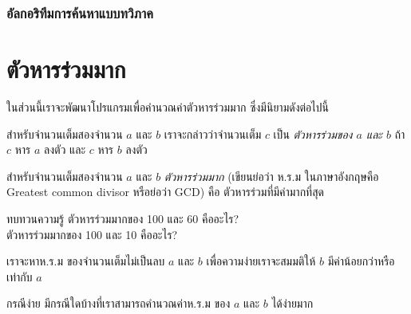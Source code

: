 \subsubsection{อัล{\wbr}กอ{\wbr}ริ{\wbr}ทึม{\wbr}การ{\wbr}ค้นหา{\wbr}แบบ{\wbr}ทวิภาค}

\section{ตัวหารร่วมมาก}

ใน{\wbr}ส่วน{\wbr}นี้{\wbr}เรา{\wbr}จะ{\wbr}พัฒนา{\wbr}โปรแกรม{\wbr}เพื่อ{\wbr}คำนวณ{\wbr}ค่าตัว{\wbr}หารร่วมมาก ซึ่ง{\wbr}มี{\wbr}นิยาม{\wbr}ดังต่อไปนี้{\wbr}

สำหรับ{\wbr}จำนวนเต็ม{\wbr}สอง{\wbr}จำนวน $a$ และ $b$ เรา{\wbr}จะ{\wbr}กล่าว{\wbr}ว่า{\wbr}จำนวนเต็ม $c$ เป็น {\em
ตัวหาร{\wbr}ร่วม{\wbr}ของ $a$ และ $b$} ถ้า $c$ หาร $a$ ลงตัว และ $c$ หาร $b$ ลงตัว{\wbr}

สำหรับ{\wbr}จำนวนเต็ม{\wbr}สอง{\wbr}จำนวน $a$ และ $b$ {\em ตัวหารร่วมมาก} (เขียน{\wbr}ย่อ{\wbr}ว่า ห.{\wbr}ร.{\wbr}ม
ใน{\wbr}ภาษาอังกฤษ{\wbr}คือ Greatest common divisor หรือ{\wbr}ย่อ{\wbr}ว่า GCD)  คือ{\wbr}
ตัวหาร{\wbr}ร่วม{\wbr}ที่{\wbr}มี{\wbr}ค่า{\wbr}มาก{\wbr}ที่สุด{\wbr}

\begin{quiz}{ทบทวน{\wbr}ความ{\wbr}รู้}
ตัวหารร่วมมาก{\wbr}ของ 100 และ 60 คือ{\wbr}อะไร? \\
ตัวหารร่วมมาก{\wbr}ของ 100 และ 10 คือ{\wbr}อะไร?
\end{quiz}

เรา{\wbr}จะ{\wbr}หา{\wbr}ห.{\wbr}ร.{\wbr}ม ของ{\wbr}จำนวนเต็ม{\wbr}ไม่{\wbr}เป็น{\wbr}ลบ $a$ และ $b$ เพื่อ{\wbr}ความ{\wbr}ง่าย{\wbr}เรา{\wbr}จะ{\wbr}สมมติ{\wbr}ให้ $b$
มี{\wbr}ค่า{\wbr}น้อย{\wbr}กว่า{\wbr}หรือ{\wbr}เท่า{\wbr}กับ $a$

\begin{quiz}{กรณี{\wbr}ง่าย}
มี{\wbr}กรณี{\wbr}ใด{\wbr}บ้าง{\wbr}ที่{\wbr}เรา{\wbr}สามารถ{\wbr}คำนวณ{\wbr}ค่า{\wbr}ห.{\wbr}ร.{\wbr}ม ของ $a$ และ $b$ ได้{\wbr}ง่าย{\wbr}มาก{\wbr}
\end{quiz}





